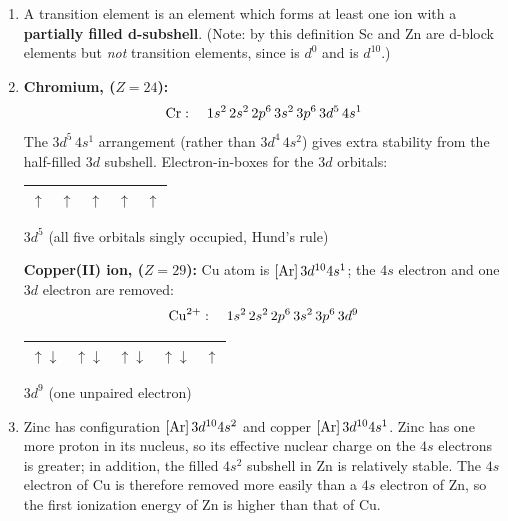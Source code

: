 \documentclass[11pt]{article}
\newcommand{\cle}[1]{{\popxbold\color{popdark}#1}}
\begin{document}
\begin{corrige}
\begin{enumerate}
\item A \cle{transition element} is an element which forms at least one ion with a \textbf{partially filled d-subshell}. (Note: by this definition Sc and Zn are d-block elements but \emph{not} transition elements, since  is $d^0$ and  is $d^{10}$.)

\item \textbf{Chromium,  ($Z = 24$):}
\[
\ce{Cr}: \quad 1s^2\,2s^2\,2p^6\,3s^2\,3p^6\,3d^5\,4s^1
\]
The $3d^5\,4s^1$ arrangement (rather than $3d^4\,4s^2$) gives extra stability from the half-filled $3d$ subshell. Electron-in-boxes for the $3d$ orbitals:
\begin{center}
\begin{tabular}{|c|c|c|c|c|}
\hline
$\uparrow$ & $\uparrow$ & $\uparrow$ & $\uparrow$ & $\uparrow$ \\ \hline
\end{tabular}
\quad $3d^5$ (all five orbitals singly occupied, Hund's rule)
\end{center}

\textbf{Copper(II) ion,  ($Z = 29$):} Cu atom is $[\ce{Ar}]\,3d^{10}4s^1$; the $4s$ electron and one $3d$ electron are removed:
\[
\ce{Cu^{2+}}: \quad 1s^2\,2s^2\,2p^6\,3s^2\,3p^6\,3d^9
\]
\begin{center}
\begin{tabular}{|c|c|c|c|c|}
\hline
$\uparrow\downarrow$ & $\uparrow\downarrow$ & $\uparrow\downarrow$ & $\uparrow\downarrow$ & $\uparrow$ \\ \hline
\end{tabular}
\quad $3d^9$ (one unpaired electron)
\end{center}

\item Zinc has configuration $[\ce{Ar}]\,3d^{10}4s^2$ and copper $[\ce{Ar}]\,3d^{10}4s^1$. Zinc has one more proton in its nucleus, so its effective nuclear charge on the $4s$ electrons is greater; in addition, the filled $4s^2$ subshell in Zn is relatively stable. The $4s$ electron of Cu is therefore removed more easily than a $4s$ electron of Zn, so the first ionization energy of Zn is higher than that of Cu.
\end{enumerate}
\end{corrige}
\end{document}
